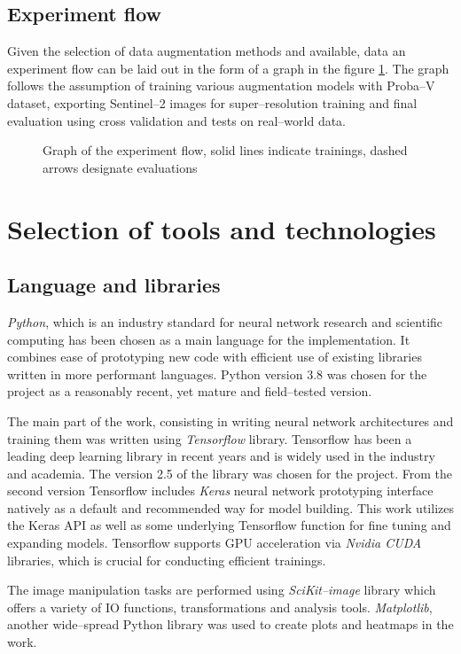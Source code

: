 \subsection{Experiment flow}
Given the selection of data augmentation methods and available, data an experiment flow can be laid out in the form of a graph in the figure \ref{fig:experiment-flow}.
The graph follows the assumption of training various augmentation models with Proba--V dataset, exporting Sentinel--2 images for super--resolution training and final evaluation using cross validation and tests on real--world data.
\begin{figure}
	\centering
	
	\caption{Graph of the experiment flow, solid lines indicate trainings, dashed arrows designate evaluations}
	\label{fig:experiment-flow}
\end{figure}

\section{Selection of tools and technologies}
\subsection{Language and libraries}
\textit{Python}, which is an industry standard for neural network research and scientific computing has been chosen as a main language for the implementation.
It combines ease of prototyping new code with efficient use of existing libraries written in more performant languages.
Python version 3.8 was chosen for the project as a reasonably recent, yet mature and field--tested version.

The main part of the work, consisting in writing neural network architectures and training them was written using \textit{Tensorflow} library.
Tensorflow has been a leading deep learning library in recent years and is widely used in the industry and academia.
The version 2.5 of the library was chosen for the project.
From the second version Tensorflow includes \textit{Keras} neural network prototyping interface natively as a default and recommended way for model building.
This work utilizes the Keras API as well as some underlying Tensorflow function for fine tuning and expanding models.
Tensorflow supports GPU acceleration via \textit{Nvidia CUDA} libraries, which is crucial for conducting efficient trainings.

The image manipulation tasks are performed using \textit{SciKit--image} library which offers a variety of IO functions, transformations and analysis tools.
\textit{Matplotlib}, another wide--spread Python library was used to create plots and heatmaps in the work.

